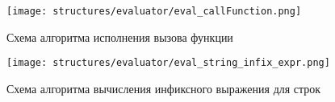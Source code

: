 \clearpage

\begin{figure}[!htp]
	\centering
	\texttt{[image: structures/evaluator/eval\_callFunction.png]}
	\caption{Схема алгоритма исполнения вызова функции}
	\label{f:eval_callFunction}
\end{figure}

\clearpage

\begin{figure}[!htp]
	\centering
	\texttt{[image: structures/evaluator/eval\_string\_infix\_expr.png]}
	\caption{Схема алгоритма вычисления инфиксного выражения для строк}
	\label{f:eval_string_infix_expr}
\end{figure}